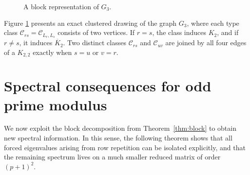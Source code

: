 \documentclass[12pt]{article}
\theoremstyle{definition}
\newcommand{\calC}{\mathcal{C}}
\begin{document}
\begin{figure}[H]
		\caption{A block representation of $G_3$.}
		\label{fig:G3-joined-union-manual}
	\end{figure}
	Figure \ref{fig:G3-joined-union-manual} presents an exact clustered drawing of the graph $G_3$, where each type class $\calC_{rs}=\calC_{L_r,L_s}$ consists of two vertices. If $r=s$, the class induces $K_2$, and if $r\neq s$, it induces $\overline{K}_2$. Two distinct classes $\calC_{rs}$ and $\calC_{uv}$ are joined by all four edges of a $K_{2,2}$
	exactly when $s=u$ or $v=r$.
	\section{Spectral consequences for odd prime modulus}\label{sec:spectral}
	
	We now exploit the block decomposition from Theorem~\ref{thm:block} to obtain new spectral information. In this sense,  the following theorem shows that all forced eigenvalues arising from row repetition can be isolated explicitly, and that the remaining spectrum lives on a much smaller reduced matrix of order $(p+1)^2$.
	
\end{document}
